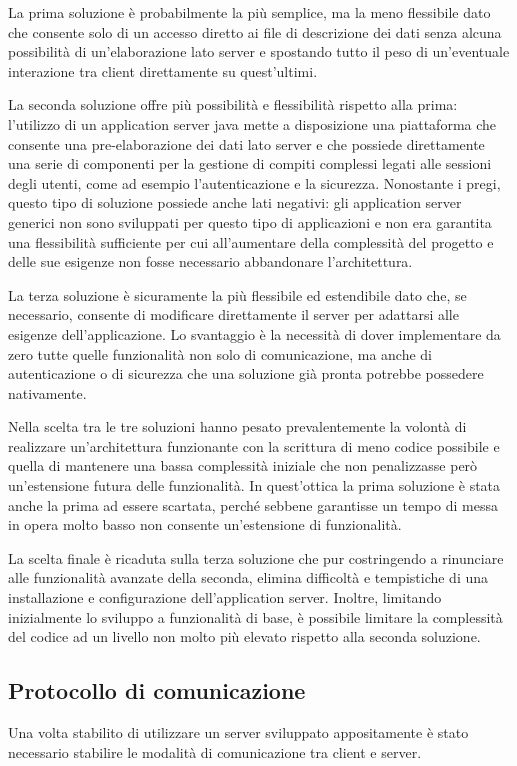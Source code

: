 La prima soluzione è probabilmente la più semplice, ma la meno flessibile dato che consente solo di un accesso diretto ai file di descrizione dei dati senza alcuna possibilità di un'elaborazione lato server e spostando tutto il peso di un'eventuale interazione tra client direttamente su quest'ultimi.

La seconda soluzione offre più possibilità e flessibilità rispetto alla prima: l'utilizzo di un application server java mette a disposizione una piattaforma che consente una pre-elaborazione dei dati lato server e che possiede direttamente una serie di componenti per la gestione di compiti complessi legati alle sessioni degli utenti, come ad esempio l'autenticazione e la sicurezza. Nonostante i pregi, questo tipo di soluzione possiede anche lati negativi: gli application server generici non sono sviluppati per questo tipo di applicazioni e non era garantita una flessibilità sufficiente per cui all'aumentare della complessità del progetto e delle sue esigenze non fosse necessario abbandonare l'architettura. 

La terza soluzione è sicuramente la più flessibile ed estendibile dato che, se necessario, consente di modificare direttamente il server per adattarsi alle esigenze dell'applicazione. Lo svantaggio è la necessità di dover implementare da zero tutte quelle funzionalità non solo di comunicazione, ma anche di autenticazione o di sicurezza che una soluzione già pronta potrebbe possedere nativamente.

Nella scelta tra le tre soluzioni hanno pesato prevalentemente la volontà di realizzare un'architettura funzionante con la scrittura di meno codice possibile e quella di mantenere una bassa complessità iniziale che non penalizzasse però un'estensione futura delle funzionalità. In quest'ottica la prima soluzione è stata anche la prima ad essere scartata, perché sebbene garantisse un tempo di messa in opera molto basso non consente un'estensione di funzionalità. 

La scelta finale è ricaduta sulla terza soluzione che pur costringendo a rinunciare alle funzionalità avanzate della seconda, elimina difficoltà e tempistiche di una installazione e configurazione dell'application server. Inoltre, limitando inizialmente lo sviluppo a funzionalità di base, è possibile limitare la complessità del codice ad un livello non molto più elevato rispetto alla seconda soluzione.

\subsection{Protocollo di comunicazione}
\label{sub:comprotocol}
Una volta stabilito di utilizzare un server sviluppato appositamente è stato necessario stabilire le modalità di comunicazione tra client e server. 

